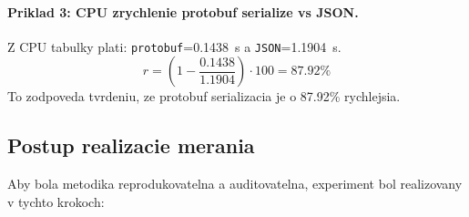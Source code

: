 \documentclass[12pt,a4paper]{report}
\begin{document}
\paragraph{Priklad 3: CPU zrychlenie protobuf serialize vs JSON.}
Z CPU tabulky plati:
\texttt{protobuf}=0.1438~s a \texttt{JSON}=1.1904~s.
\begin{equation}
r = \left(1-\frac{0.1438}{1.1904}\right)\cdot100 = 87.92\%
\end{equation}
To zodpoveda tvrdeniu, ze protobuf serializacia je o 87.92\% rychlejsia.

\subsection{Postup realizacie merania}

Aby bola metodika reprodukovatelna a auditovatelna, experiment bol realizovany
v tychto krokoch:
\end{document}

